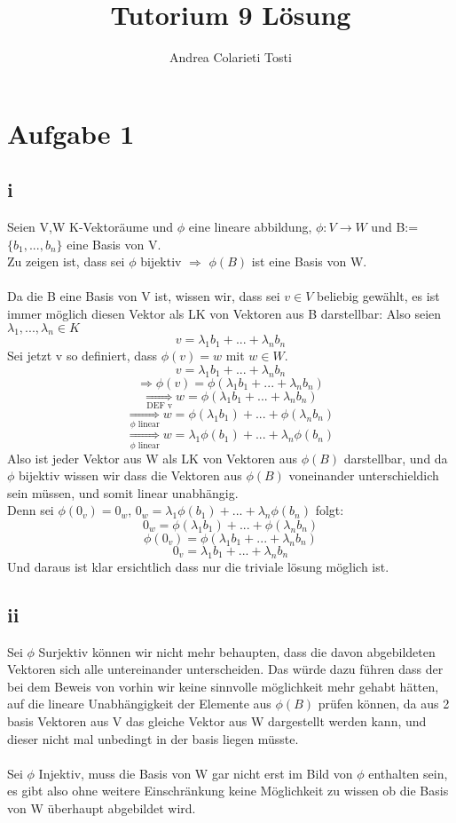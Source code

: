 \documentclass[10pt,a4paper]{article}
\author{Andrea Colarieti Tosti}
\title{Tutorium 9 Lösung}
\begin{document}
\maketitle 
\newpage

\section{Aufgabe 1}
\subsection{i}
Seien V,W K-Vektoräume und $\phi$ eine lineare abbildung, $\phi: V \rightarrow W$ und B:=$\{b_1,...,b_n\}$ eine Basis von V.\\
Zu zeigen ist, dass sei $\phi$ bijektiv $\Rightarrow$ $\phi(B)$ ist eine Basis von W.\\\\
Da die B eine Basis von V ist, wissen wir, dass sei $v \in V$ beliebig gewählt, es ist immer möglich diesen Vektor als LK von Vektoren aus B darstellbar: Also seien $\lambda_1,...,\lambda_n \in K$
$$ v = \lambda_1 b_1+...+\lambda_n b_n$$
Sei jetzt v so definiert, dass $\phi(v)= w$ mit $w \in W$. 
$$ v = \lambda_1 b_1+...+\lambda_n b_n$$
$$\Rightarrow \phi(v) = \phi(\lambda_1 b_1+...+\lambda_n b_n)$$
$$ \underset{\text{DEF v}}{\Rightarrow}  w = \phi(\lambda_1 b_1+...+\lambda_n b_n)$$
$$ \underset{\phi \text{ linear}}{\Rightarrow}  w = \phi(\lambda_1 b_1)+...+\phi(\lambda_n b_n)$$
$$ \underset{\phi \text{ linear}}{\Rightarrow}  w = \lambda_1\phi(b_1)+...+\lambda_n\phi(b_n)$$
Also ist jeder Vektor aus W als LK von Vektoren aus $\phi(B)$ darstellbar, und da $\phi$ bijektiv wissen wir dass die 
Vektoren aus $\phi(B)$ voneinander unterschieldich sein müssen, und somit linear unabhängig.\\
Denn sei $\phi(0_v)=0_w$,  $0_w = \lambda_1\phi(b_1)+...+\lambda_n\phi(b_n) $ folgt:
$$ 0_w = \phi(\lambda_1 b_1)+...+\phi(\lambda_n b_n) $$
$$ \phi(0_v) = \phi(\lambda_1 b_1+...+\lambda_n b_n) $$
$$ 0_v = \lambda_1 b_1+...+\lambda_n b_n $$
Und daraus ist klar ersichtlich dass nur die triviale lösung möglich ist.
\subsection{ii}
Sei $\phi$ Surjektiv können wir nicht mehr behaupten, dass die davon abgebildeten Vektoren sich alle untereinander unterscheiden. Das würde dazu führen dass der bei dem Beweis von vorhin wir keine sinnvolle möglichkeit mehr gehabt hätten, auf die lineare Unabhängigkeit der Elemente aus $\phi(B)$ prüfen können, da aus 2 basis Vektoren aus V das gleiche Vektor aus W dargestellt werden kann, und dieser nicht mal unbedingt in der basis liegen müsste.\\\\
Sei $\phi$ Injektiv, muss die Basis von W gar nicht erst im Bild von $\phi$ enthalten sein, es gibt also ohne weitere 
Einschränkung keine Möglichkeit zu wissen ob die Basis von W überhaupt abgebildet wird.
\end{document}
